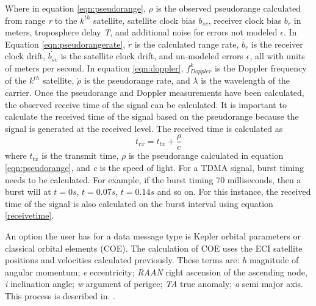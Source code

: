 \documentclass[12pt]{report}
\begin{document}
Where in equation \ref{eqn:pseudorange}, $\rho$ is the observed pseudorange calculated from range \textit{r} to the $k^{th}$ satellite, satellite clock bias $b_{sv}$, receiver clock bias $b_{r}$ in meters, troposphere delay \textit{T},  and additional noise for errors not modeled $\epsilon$. In Equation \ref{eqn:pseudorangerate}, $\dot{r}$ is the calculated range rate, $\dot{b_r}$ is the receiver clock drift, $\dot{b_{sv}}$ is the satellite clock drift, and un-modeled errors $\epsilon$, all with units of meters per second. In equation \ref{eqn:doppler}, $f^{k}_{Doppler}$ is the Doppler frequency of the $k^{th}$ satellite, $\dot{\rho}$ is the pseudorange rate, and $\lambda$ is the wavelength of the carrier. Once the pseudorange and Doppler measurements have been calculated, the observed receive time of the signal can be calculated. It is important to calculate the received time of the signal based on the pseudorange because the signal is generated at the received level. The received time is calculated as 
\begin{equation}
    t_{rx} = t_{tx} + \frac{\rho}{c}
    \label{receivetime}
\end{equation}
where $t_{tx}$ is the transmit time, $\rho$ is the pseudorange calculated in equation \ref{eqn:pseudorange}, and \textit{c} is the speed of light. For a TDMA signal, burst timing needs to be calculated. For example, if the burst timing 70 milliseconds, then a burst will at $t=0s$, $t=0.07s$, $t=0.14s$ and so on. For this instance, the received time of the signal is also calculated on the burst interval using equation \ref{receivetime}.

An option the user has for a data message type is Kepler orbital parameters or classical orbital elements (COE). The calculation of COE uses the ECI satellite positions and velocities calculated previously. These terms are: \textit{h} magnitude of angular momentum; \textit{e} eccentricity; \textit{RAAN} right ascension of the ascending node, \textit{i} inclination angle; \textit{w} argument of perigee; \textit{TA} true anomaly; \textit{a} semi major axis. This process is described in. \cite{curtisOrbitalMechanicsEngineering2008}.
\end{document}
